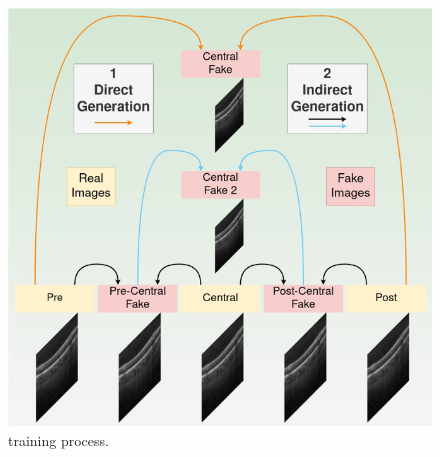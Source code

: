 \begin{figure}[!ht]
	\centering
	\includegraphics[width=0.70\linewidth]{figures/GANGenerationFramework.png}
	\caption{\textcite{Lopez2023} training process.}
	\label{fig:GANGenerationFramework}
\end{figure}

